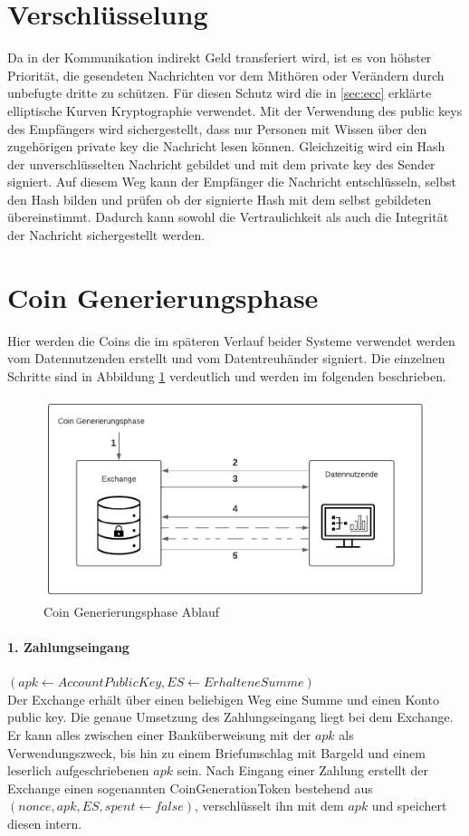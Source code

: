 \documentclass[11pt,a4paper]{scrreprt}
\begin{document}

\section{Verschlüsselung}
Da in der Kommunikation indirekt Geld transferiert wird, ist es von höhster Priorität, die gesendeten Nachrichten vor dem Mithören oder Verändern durch unbefugte dritte zu schützen. Für diesen Schutz wird die in \ref{sec:ecc} erklärte elliptische Kurven Kryptographie verwendet. Mit der Verwendung des public keys des Empfängers wird sichergestellt, dass nur Personen mit Wissen über den zugehörigen private key die Nachricht lesen können. Gleichzeitig wird ein Hash der unverschlüsselten Nachricht gebildet und mit dem private key des Sender signiert. Auf diesem Weg kann der Empfänger die Nachricht entschlüsseln, selbst den Hash bilden und prüfen ob der signierte Hash mit dem selbst gebildeten übereinstimmt. Dadurch kann sowohl die Vertraulichkeit als auch die Integrität der Nachricht sichergestellt werden.

\section{Coin Generierungsphase}
Hier werden die Coins die im späteren Verlauf beider Systeme verwendet werden vom Datennutzenden erstellt und vom Datentreuhänder signiert. Die einzelnen Schritte sind in Abbildung \ref{fig:coin-generationphase} verdeutlich und werden im folgenden beschrieben.
\begin{figure}[H]
    \centering
    \includegraphics[width=0.9\linewidth]{CoinGenerationPhaseDiagramm.pdf}
    \caption{Coin Generierungsphase Ablauf}
    \label{fig:coin-generationphase}
\end{figure}

\paragraph{1. Zahlungseingang} $(apk \leftarrow AccountPublicKey, ES \leftarrow ErhalteneSumme)$\\
Der Exchange erhält über einen beliebigen Weg eine Summe und einen Konto public key. Die genaue Umsetzung des Zahlungseingang liegt bei dem Exchange. Er kann alles zwischen einer Banküberweisung mit der $apk$ als Verwendungszweck, bis hin zu einem Briefumschlag mit Bargeld und einem leserlich aufgeschriebenen $apk$ sein. Nach Eingang einer Zahlung erstellt der Exchange einen sogenannten CoinGenerationToken bestehend aus $(nonce, apk, ES, spent \leftarrow false)$, verschlüsselt ihn mit dem $apk$ und speichert diesen intern.
\end{document}
